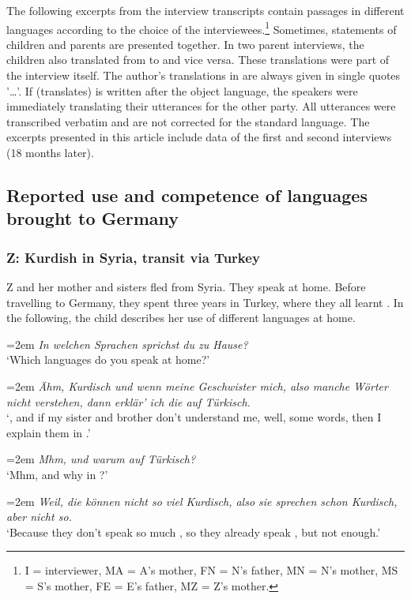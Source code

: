 \documentclass[output=paper,colorlinks,citecolor=brown]{langscibook}
\newenvironment{interview}{
  \setlength{\leftskip}{2.5em} %
  \setlength{\rightskip}{2.5em} %
  \setlength{\parindent}{0pt} %
  \vspace{\topsep} %
}{
  \vspace{\topsep} %
}
\newcommand{\speaker}[1]{%
  \noindent\hangindent=2em\makebox[1.5em][l]{#1:}\hspace{0.5em}%
}
\newcommand{\myattrib}[1]{%
    \attrib{#1}
}
\begin{document}
The following excerpts from the interview transcripts contain passages in different languages according to the choice of the interviewees.\footnote{I = interviewer, MA = A's mother, FN = N's father, MN = N's mother, MS = S's mother, FE = E's father, MZ = Z's mother.} Sometimes, statements of children and parents are presented together. In two parent interviews, the children also translated from  to  and vice versa. These translations were part of the interview itself. The author's translations in  are always given in single quotes '…'. If (translates) is written after the object language, the speakers were immediately translating their utterances for the other party. All utterances were transcribed verbatim and are not corrected for the standard language. The excerpts presented in this article include data of the first and second interviews (18 months later).   

\subsection{Reported use and competence of languages brought to Germany}\label{ch2.5.ss.4.2}

\subsubsection{Z: Kurdish in Syria, transit via Turkey}\label{ch2.5.ss.4.2.1}

Z and her mother and sisters fled from Syria. They speak  at home. Before travelling to Germany, they spent three years in Turkey, where they all learnt . In the following, the child describes her use of different languages at home.

\begin{interview}\label{ch2.5.ex.1}
\speaker{I}\textit{In welchen Sprachen sprichst du zu Hause?} \\
`Which languages do you speak at home?'  

\speaker{Z}\textit{Ähm, Kurdisch und wenn meine Geschwister mich, also manche Wörter nicht verstehen, dann erklär' ich die auf Türkisch.} \\
`, and if my sister and brother don't understand me, well, some words, then I explain them in .' 

\speaker{I}\textit{Mhm, und warum auf Türkisch?} \\
`Mhm, and why in ?' 

\speaker{Z}\textit{Weil, die können nicht so viel Kurdisch, also sie sprechen schon Kurdisch, aber nicht so.} \\
`Because they don't speak so much , so they already speak , but not enough.' 
\myattrib{Int 1\_Z I, 21--26}
\end{interview}
\end{document}
